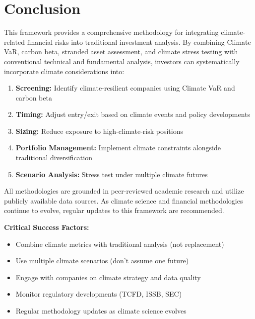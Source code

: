 \documentclass[11pt,a4paper]{article}
\begin{document}
\section{Conclusion}

This framework provides a comprehensive methodology for integrating climate-related financial risks into traditional investment analysis. By combining Climate VaR, carbon beta, stranded asset assessment, and climate stress testing with conventional technical and fundamental analysis, investors can systematically incorporate climate considerations into:

\begin{enumerate}
    \item \textbf{Screening:} Identify climate-resilient companies using Climate VaR and carbon beta
    \item \textbf{Timing:} Adjust entry/exit based on climate events and policy developments
    \item \textbf{Sizing:} Reduce exposure to high-climate-risk positions
    \item \textbf{Portfolio Management:} Implement climate constraints alongside traditional diversification
    \item \textbf{Scenario Analysis:} Stress test under multiple climate futures
\end{enumerate}

All methodologies are grounded in peer-reviewed academic research and utilize publicly available data sources. As climate science and financial methodologies continue to evolve, regular updates to this framework are recommended.

\textbf{Critical Success Factors:}
\begin{itemize}
    \item Combine climate metrics with traditional analysis (not replacement)
    \item Use multiple climate scenarios (don't assume one future)
    \item Engage with companies on climate strategy and data quality
    \item Monitor regulatory developments (TCFD, ISSB, SEC)
    \item Regular methodology updates as climate science evolves
\end{itemize}



\end{document}
